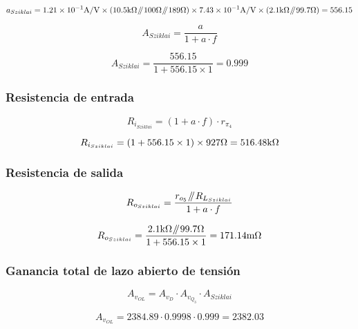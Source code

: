 \begin{equation*}
a_{Sziklai} = \num{1.21E-1} \si[per-mode=symbol]{\ampere\per\volt} \times \left( 10.5 \si[per-mode=symbol]{\kilo\ohm} \parallelresistors 100 \si[per-mode=symbol]{\ohm} \parallelresistors  189 \si[per-mode=symbol]{\ohm} \right) \times \num{7.43E-1} \si[per-mode=symbol]{\ampere\per\volt} \times \left( 2.1 \si[per-mode=symbol]{\kilo\ohm} \parallelresistors 99.7 \si[per-mode=symbol]{\ohm} \right) = 556.15
\end{equation*}


\begin{equation}
A_{Sziklai} = \frac{a}{1 + a \cdot f}
\end{equation}

\begin{equation*}
A_{Sziklai} = \frac{556.15}{1 + 556.15 \times 1} = 0.999
\end{equation*}

\subsubsection{Resistencia de entrada}

\begin{equation}
R_{i_{Sziklai}} = \left( 1 + a \cdot f \right) \cdot r_{\pi_{4}}
\end{equation}

\begin{equation*}
R_{i_{Sziklai}} = \left( 1 + 556.15 \times 1 \right) \times 927  \si[per-mode=symbol]{\ohm} = 516.48 \si[per-mode=symbol]{\kilo\ohm}
\end{equation*}



\subsubsection{Resistencia de salida}

\begin{equation}
R_{o_{Sziklai}} = \frac{ r_{o_{5}} \parallelresistors R_{L_{Sziklai}}  }{1 + a \cdot f}
\end{equation}

\begin{equation*}
R_{o_{Sziklai}} = \frac{ 2.1 \si[per-mode=symbol]{\kilo\ohm} \parallelresistors 99.7 \si[per-mode=symbol]{\ohm}  }{  1 + 556.15 \times 1 } = 171.14 \si[per-mode=symbol]{\milli\ohm}
\end{equation*}


\subsubsection{Ganancia total de lazo abierto de tensión}

\begin{equation}
A_{v_{OL}} = A_{v_{D}} \cdot A_{v_{Q_{3}}} \cdot A_{Sziklai}
\end{equation}

\begin{equation*}
A_{v_{OL}} = 2384.89 \cdot 0.9998 \cdot 0.999 = 2382.03
\end{equation*}





